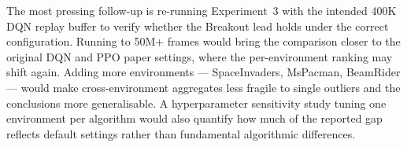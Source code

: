The most pressing follow-up is re-running Experiment~3 with the intended 400K DQN replay buffer to verify whether the Breakout lead holds under the correct configuration. Running to 50M+ frames would bring the comparison closer to the original DQN and PPO paper settings, where the per-environment ranking may shift again. Adding more environments --- SpaceInvaders, MsPacman, BeamRider --- would make cross-environment aggregates less fragile to single outliers and the conclusions more generalisable. A hyperparameter sensitivity study tuning one environment per algorithm would also quantify how much of the reported gap reflects default settings rather than fundamental algorithmic differences.


